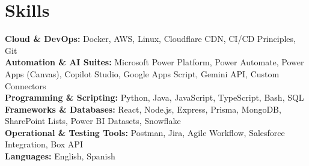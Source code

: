 \documentclass[letterpaper,11pt]{article}
\begin{document}
\section{Skills}
 \begin{itemize}[leftmargin=0.15in, label={}]
    \small{\item{
     \textbf{Cloud \& DevOps:} Docker, AWS, Linux, Cloudflare CDN, CI/CD Principles, Git \\
     \textbf{Automation \& AI Suites:} Microsoft Power Platform, Power Automate, Power Apps (Canvas), Copilot Studio, Google Apps Script, Gemini API, Custom Connectors \\
     \textbf{Programming \& Scripting:} Python, Java, JavaScript, TypeScript, Bash, SQL \\
     \textbf{Frameworks \& Databases:} React, Node.js, Express, Prisma, MongoDB, SharePoint Lists, Power BI Datasets, Snowflake \\
     \textbf{Operational \& Testing Tools:} Postman, Jira, Agile Workflow, Salesforce Integration, Box API \\
     \textbf{Languages:} English, Spanish
    }}
 \end{itemize}
\end{document}
